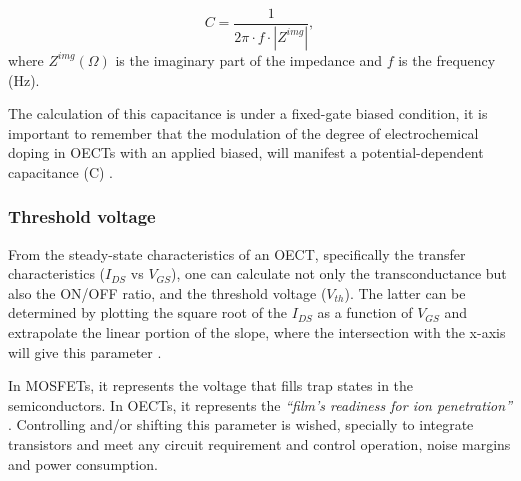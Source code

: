 \begin{equation} \label{eq:C}
	C = \frac{1}{2\pi \cdot f \cdot |Z^{img}|},
\end{equation}
where $Z^{img} (\Omega)$ is the imaginary part of the impedance and $f$ is the frequency (Hz).

The calculation of this capacitance is under a fixed-gate biased condition, it is important to remember that the modulation of the degree of electrochemical doping in OECTs with an applied biased, will manifest a potential-dependent capacitance (C)%
\cite{inalBenchmarkingOrganicMixed2017}.

\subsubsection{Threshold voltage}

From the steady-state characteristics of an OECT, specifically the transfer characteristics ($I_{DS}$ vs $V_{GS}$), one can calculate not only the transconductance but also the ON/OFF ratio, and the threshold voltage ($V_{th}$). The latter can be determined by plotting the square root of the $I_{DS}$ as a function of $V_{GS}$ and extrapolate the linear portion of the slope, where the intersection with the x-axis will give this parameter \cite{ohayonGuideCharacterizationOrganic2023}.

In MOSFETs, it represents the voltage that fills trap states in the semiconductors. In OECTs, it represents the \textit{``film's readiness for ion penetration''} \cite{ohayonGuideCharacterizationOrganic2023}. Controlling and/or shifting this parameter is wished, specially to integrate transistors and meet any circuit requirement and control operation, noise margins and power consumption. 

